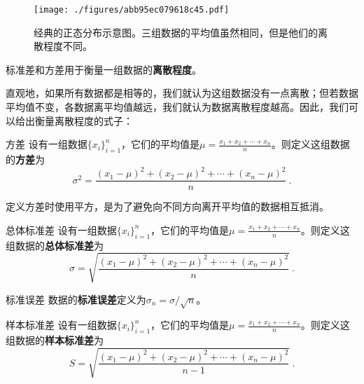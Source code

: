 


\begin{figure}[ht]
\centering
\texttt{[image: ./figures/abb95ec079618c45.pdf]}
\caption{经典的正态分布示意图。三组数据的平均值虽然相同，但是他们的离散程度不同。} \label{fig_StDevi_1}
\end{figure}

标准差和方差用于衡量一组数据的\textbf{离散程度}。

直观地，如果所有数据都是相等的，我们就认为这组数据没有一点离散；但若数据平均值不变，各数据离平均值越远，我们就认为数据离散程度越高。因此，我们可以给出衡量离散程度的式子：

\begin{definition}{方差}\label{def_StDevi_1}
设有一组数据$\{x_i\}_{i=1}^n$，它们的平均值是$\mu=\frac{x_1+x_2+\cdots+x_n}{n}$。则定义这组数据的\textbf{方差}为
\begin{equation}\label{eq_StDevi_1}
\sigma^2 = \frac{(x_1-\mu)^2+(x_2-\mu)^2+\cdots+(x_n-\mu)^2}{n}~.
\end{equation}
\end{definition}

定义方差时使用平方，是为了避免向不同方向离开平均值的数据相互抵消。

\begin{definition}{总体标准差}
设有一组数据$\{x_i\}_{i=1}^n$，它们的平均值是$\mu=\frac{x_1+x_2+\cdots+x_n}{n}$。则定义这组数据的\textbf{总体标准差}为
\begin{equation}
\sigma = \sqrt{\frac{(x_1-\mu)^2+(x_2-\mu)^2+\cdots+(x_n-\mu)^2}{n}}~.
\end{equation}
\end{definition}

\begin{definition}{标准误差}
数据的\textbf{标准误差}定义为$\sigma_n=\sigma/\sqrt{n}$。
\end{definition}





\begin{definition}{样本标准差}
设有一组数据$\{x_i\}_{i=1}^n$，它们的平均值是$\mu=\frac{x_1+x_2+\cdots+x_n}{n}$。则定义这组数据的\textbf{样本标准差}为
\begin{equation}
S = \sqrt{\frac{(x_1-\mu)^2+(x_2-\mu)^2+\cdots+(x_n-\mu)^2}{n-1}}~.
\end{equation}
\end{definition}


